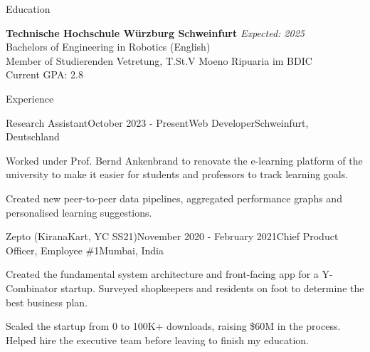 \documentclass[
	a4paper, %
	11pt, %
]{resume} %
\begin{document}

\begin{rSection}{Education}

	\textbf{Technische Hochschule Würzburg Schweinfurt} \hfill \textit{Expected: 2025} \\
	Bachelors of Engineering in Robotics (English) \\
	Member of Studierenden Vetretung, T.St.V Moeno Ripuaria im BDIC \\
	Current GPA: 2.8

\end{rSection}


\begin{rSection}{Experience}

	\begin{rSubsection}{Research Assistant}{October 2023 - Present}{Web Developer}{Schweinfurt, Deutschland}
		\item Worked under Prof. Bernd Ankenbrand to renovate the e-learning platform of the university to make it easier for students and professors to track learning goals.
		\item Created new peer-to-peer data pipelines, aggregated performance graphs and personalised learning suggestions.
	\end{rSubsection}


	\begin{rSubsection}{Zepto (KiranaKart, YC SS21)}{November 2020 - February 2021}{Chief Product Officer, Employee \#1}{Mumbai, India}
		\item Created the fundamental system architecture and front-facing app for a Y-Combinator startup. Surveyed shopkeepers and residents on foot to determine the best business plan.
		\item Scaled the startup from 0 to 100K+ downloads, raising \$60M in the process. Helped hire the executive team before leaving to finish my education.
	\end{rSubsection}

\end{rSection}
\end{document}
